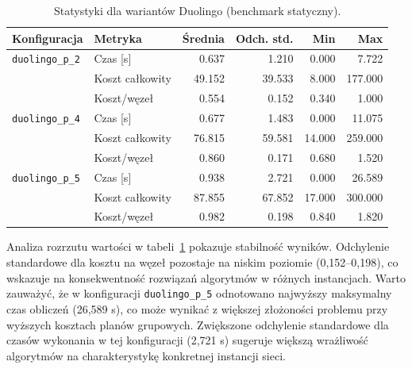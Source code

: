 \begin{table}[H]
  \centering
  \caption{Statystyki dla wariantów Duolingo (benchmark statyczny).}
  \label{tab:ext-duolingo-stats}
  \begin{tabular}{llrrrr}
    \toprule
    \textbf{Konfiguracja}   & \textbf{Metryka} & \textbf{Średnia} & \textbf{Odch. std.} & \textbf{Min} & \textbf{Max} \\
    \midrule
    \texttt{duolingo\_p\_2} & Czas [s]         & 0.637            & 1.210               & 0.000        & 7.722        \\
                            & Koszt całkowity  & 49.152           & 39.533              & 8.000        & 177.000      \\
                            & Koszt/węzeł      & 0.554            & 0.152               & 0.340        & 1.000        \\
    \midrule
    \texttt{duolingo\_p\_4} & Czas [s]         & 0.677            & 1.483               & 0.000        & 11.075       \\
                            & Koszt całkowity  & 76.815           & 59.581              & 14.000       & 259.000      \\
                            & Koszt/węzeł      & 0.860            & 0.171               & 0.680        & 1.520        \\
    \midrule
    \texttt{duolingo\_p\_5} & Czas [s]         & 0.938            & 2.721               & 0.000        & 26.589       \\
                            & Koszt całkowity  & 87.855           & 67.852              & 17.000       & 300.000      \\
                            & Koszt/węzeł      & 0.982            & 0.198               & 0.840        & 1.820        \\
    \bottomrule
  \end{tabular}
\end{table}

Analiza rozrzutu wartości w tabeli~\ref{tab:ext-duolingo-stats} pokazuje stabilność wyników. Odchylenie standardowe dla kosztu na węzeł pozostaje na niskim poziomie (0,152--0,198), co wskazuje na konsekwentność rozwiązań algorytmów w różnych instancjach. Warto zauważyć, że w konfiguracji \texttt{duolingo\_p\_5} odnotowano najwyższy maksymalny czas obliczeń (26,589 s), co może wynikać z większej złożoności problemu przy wyższych kosztach planów grupowych. Zwiększone odchylenie standardowe dla czasów wykonania w tej konfiguracji (2,721 s) sugeruje większą wrażliwość algorytmów na charakterystykę konkretnej instancji sieci.

